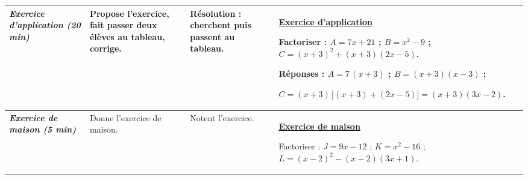 \documentclass[10pt]{article}
\newcommand{\titreR}[1]{\underline{\textcolor{rougetitre}{\bfseries #1}}}
\newcommand{\app}{\titreR{Exercice d'application}}
\newcommand{\maison}{\underline{\textcolor{rougemaison}{\bfseries Exercice de maison}}}
\newcommand{\moment}[1]{\textbf{\itshape #1}}
\begin{document}
\begin{longtable}{|p{2.35cm}|p{5.35cm}|p{4.55cm}|p{13.85cm}|}
\moment{Exercice d'application (20 min)} &
Propose l'exercice, fait passer deux élèves au tableau, corrige. &
\textbf{Résolution} : cherchent puis passent au tableau. &
\app \par
Factoriser : \; $A=7x+21$ ; \; $B=x^2-9$ ; \; $C=(x+3)^2+(x+3)(2x-5)$. \par
\textbf{Réponses :} $A=7\,(x+3)$ ; \; $B=(x+3)(x-3)$ ; \par
$C=(x+3)\,\big[(x+3)+(2x-5)\big]=(x+3)(3x-2)$. \\ \hline

\moment{Exercice de maison (5 min)} &
Donne l'exercice de maison. &
Notent l'exercice. &
\maison \par
Factoriser : \; $J=9x-12$ ; \; $K=x^2-16$ ; \; $L=(x-2)^2-(x-2)(3x+1)$. \\ \hline
\end{longtable}
\end{document}

